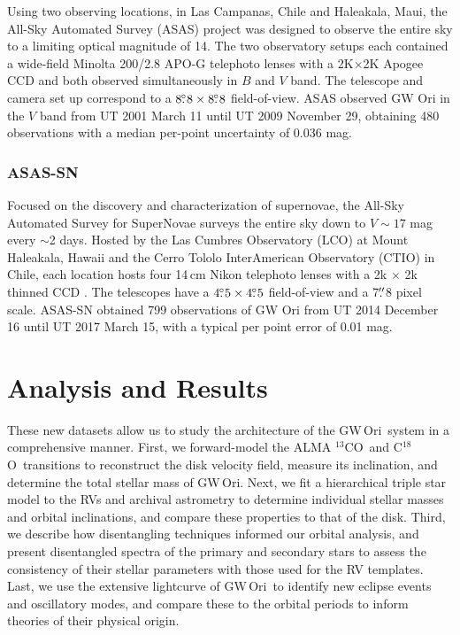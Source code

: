 \documentclass[twocolumn]{aastex61}
\newcommand{\obj}{GW\,Ori}
\newcommand{\thirteen}{${}^{13}$CO}
\newcommand{\eighteen}{C${}^{18}$O}
\begin{document}
Using two observing locations, in Las Campanas, Chile and Haleakala, Maui, the All-Sky Automated Survey (ASAS) project was designed to observe the entire sky to a limiting optical magnitude of 14. The two observatory setups each contained a wide-field Minolta 200/2.8 APO-G telephoto lenses with a 2K$\times$2K Apogee CCD and both observed simultaneously in $B$ and $V$ band. The telescope and camera set up correspond to a $8\mbox{$.\!\!^\circ$}8\times8\mbox{$.\!\!^\circ$}8$ field-of-view. ASAS observed GW Ori in the $V$ band from UT 2001 March 11 until UT 2009 November 29, obtaining 480 observations with a median per-point uncertainty of 0.036 mag.


\subsubsection{ASAS-SN}

Focused on the discovery and characterization of supernovae, the All-Sky Automated Survey for SuperNovae \citep[ASAS-SN;][]{Shappee14, kochanek17} surveys the entire sky down to $V \sim 17$ mag every $\sim$2 days. Hosted by the Las Cumbres Observatory (LCO) at Mount Haleakala, Hawaii and the Cerro Tololo InterAmerican Observatory (CTIO) in Chile, each location hosts four 14\,cm Nikon telephoto lenses with a 2k $\times$ 2k thinned CCD \citep{Brown13}. The telescopes have a $4\mbox{$.\!\!^\circ$}5\times4\mbox{$.\!\!^\circ$}5$ field-of-view and a 7$\mbox{$.\!\!^{\prime\prime}$}$8 pixel scale. ASAS-SN obtained 799 observations of GW Ori from UT 2014 December 16 until UT 2017 March 15, with a typical per point error of 0.01 mag.




\section{Analysis and Results \label{sec:analysis}}

These new datasets allow us to study the architecture of the \obj\ system in a comprehensive manner. First, we forward-model the ALMA \thirteen\ and \eighteen\ transitions to reconstruct the disk velocity field, measure its inclination, and determine the total stellar mass of \obj. Next, we fit a hierarchical triple star model to the RVs and archival astrometry to determine individual stellar masses and orbital inclinations, and compare these properties to that of the disk. Third, we describe how disentangling techniques informed our orbital analysis, and present disentangled spectra of the primary and secondary stars to assess the consistency of their stellar parameters with those used for the RV templates. Last, we use the extensive lightcurve of \obj\ to identify new eclipse events and oscillatory modes, and compare these to the orbital periods to inform theories of their physical origin.
\end{document}
